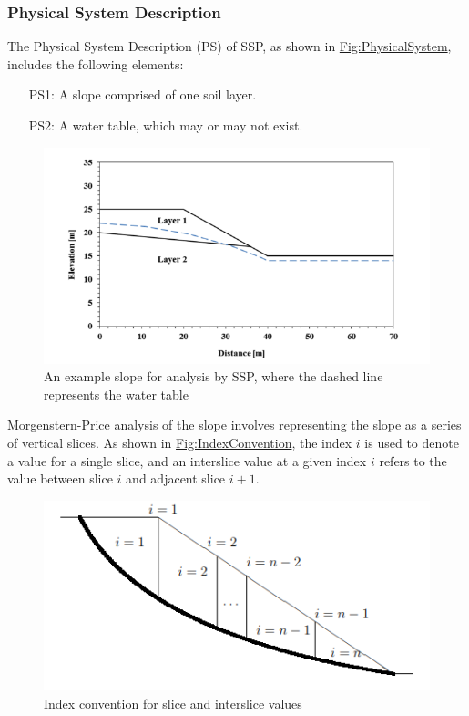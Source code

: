 \documentclass[12pt]{article}
\begin{document}
\subsubsection{Physical System Description}
\label{Sec:PhysSyst}
The Physical System Description (PS) of SSP, as shown in \hyperref[Figure:PhysicalSystem]{Fig:PhysicalSystem}, includes the following elements:
\begin{itemize}
\item[PS1:]A slope comprised of one soil layer.
\item[PS2:]A water table, which may or may not exist.
\end{itemize}
\begin{figure}
\begin{center}
\includegraphics[width=\textwidth]{../../../datafiles/SSP/PhysSyst.png}
\caption{An example slope for analysis by SSP, where the dashed line represents the water table}
\label{Figure:PhysicalSystem}
\end{center}
\end{figure}
Morgenstern-Price analysis \cite{morgenstern1965} of the slope involves representing the slope as a series of vertical slices. As shown in \hyperref[Figure:IndexConvention]{Fig:IndexConvention}, the index $i$ is used to denote a value for a single slice, and an interslice value at a given index $i$ refers to the value between slice $i$ and adjacent slice $i+1$.
\begin{figure}
\begin{center}
\includegraphics[width=\textwidth]{../../../datafiles/SSP/IndexConvention.png}
\caption{Index convention for slice and interslice values}
\label{Figure:IndexConvention}
\end{center}
\end{figure}
\end{document}

